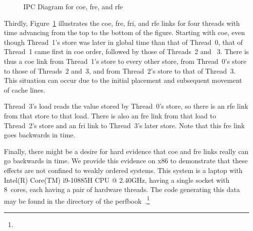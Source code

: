 \documentclass[10]{article}
\begin{document}
\begin{figure}[tb]
\begin{center}
\caption{IPC Diagram for coe, fre, and rfe}
\label{fig:IPC Diagram for coe, fre, and rfe}
\end{center}
\end{figure}

Thirdly, Figure~\ref{fig:IPC Diagram for coe, fre, and rfe} illustrates
the coe, fre, fri, and rfe links for four threads with time advancing
from the top to the bottom of the figure.  Starting with coe, even though
Thread~1's store was later in global time than that of Thread~0, that of
Thread~1 came first in coe order, followed by those of Threads~2 and ~3.
There is thus a coe link from Thread~1's store to every other store,
from Thread~0's store to those of Threads~2 and~3, and from Thread~2's
store to that of Thread~3.
This situation can occur due to the initial placement and subsequent
movement of cache lines.

Thread~3's load reads the value stored by Thread~0's store, so there is
an rfe link from that store to that load.  There is also an fre link from
that load to Thread~2's store and an fri link to Thread~3's later store.
Note that this fre link goes backwards in time.

Finally, there might be a desire for hard evidence that coe and fre
links really can go backwards in time.
We provide this evidence on x86 to demonstrate that these effects
are not confined to weakly ordered systems.
This system is a laptop with Intel(R) Core(TM) i9-10885H CPU @ 2.40GHz,
having a single socket with 8~cores, each having a pair of hardware
threads.
The code generating this data may be found in the 
directory of the
perfbook~\cite{McKenney2018ParallelProgramming-2018-12-08a}.\footnote{
	}
\end{document}

